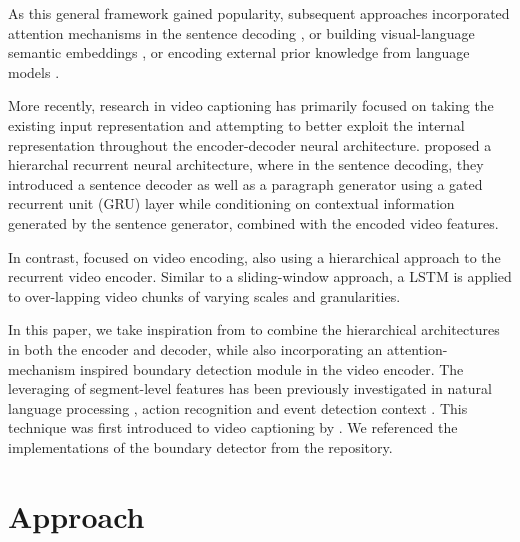 \documentclass[11pt,a4paper]{article}
\begin{document}
As this general framework gained popularity, subsequent approaches incorporated
attention mechanisms in the sentence decoding \cite{2015arXiv150208029Y}, or
building visual-language semantic embeddings
\cite{DBLP:journals/corr/PanMYLR15}, or encoding external prior knowledge from
language models \cite{DBLP:journals/corr/VenugopalanHMS16}. 

More recently, research in video captioning has primarily focused on taking the
existing input representation and attempting to better exploit the internal
representation throughout the encoder-decoder neural architecture. \citet{DBLP:journals/corr/YuWHYX15} proposed a hierarchal recurrent neural architecture, where in
the sentence decoding, they introduced a sentence decoder as well as a paragraph
generator using a gated recurrent unit (GRU) layer
\cite{DBLP:journals/corr/ChoMGBSB14} while conditioning on contextual
information generated by the sentence generator, combined with the encoded video
features. 

In contrast, \citet{DBLP:journals/corr/PanXYWZ15} focused on video encoding, also using a
hierarchical approach to the recurrent video encoder. Similar to a
sliding-window approach, a LSTM is applied to over-lapping video chunks of
varying scales and granularities. 

In this paper, we take inspiration from  \citet{DBLP:journals/corr/BaraldiGC16b} to combine the
hierarchical architectures in both the encoder and decoder, while also
incorporating an attention-mechanism inspired boundary detection module in the
video encoder. The leveraging of
segment-level features has been previously investigated in natural language
processing \cite{DBLP:journals/corr/ChungAB16}, action recognition
\cite{tang_fei-fei_koller_2012, song_morency_davis_2013,
PirsiavashRamanan14CVPR, DBLP:journals/corr/LanZZS15} and
event detection context \cite{DBLP:journals/corr/WangXW0LTG16}. This technique
was first introduced to video captioning by \citet{DBLP:journals/corr/BaraldiGC16b}. We referenced
the implementations of the boundary detector from the \citet{banet2017} repository. 

\section{Approach}
\end{document}

